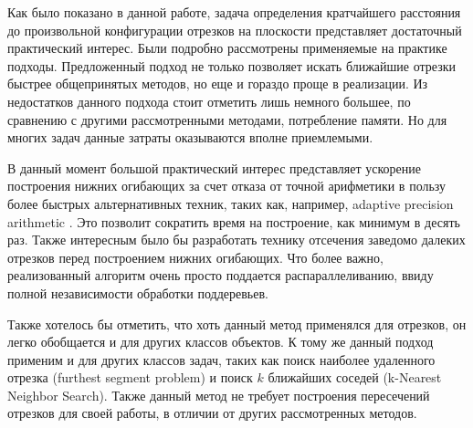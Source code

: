 \startconclusionpage

Как было показано в данной работе, задача определения кратчайшего
расстояния до произвольной конфигурации отрезков на плоскости представляет
достаточный практический интерес. Были подробно рассмотрены применяемые
на практике подходы. Предложенный подход не только позволяет искать
ближайшие отрезки быстрее общепринятых методов, но еще и гораздо проще в
реализации. Из недостатков данного подхода стоит отметить лишь немного большее, по
сравнению с другими рассмотренными методами, потребление памяти. Но для
многих задач данные затраты оказываются вполне приемлемыми.

В данный момент большой практический интерес представляет ускорение
построения нижних огибающих за счет отказа от точной арифметики в пользу более
быстрых альтернативных техник, таких как, например, adaptive precision
arithmetic \cite{APREC}. Это позволит сократить время на построение, как минимум в
десять раз. Также интересным было бы разработать технику отсечения
заведомо далеких отрезков перед построением нижних огибающих. Что более
важно, реализованный алгоритм очень просто поддается распараллеливанию,
ввиду полной независимости обработки поддеревьев.

Также хотелось бы отметить, что хоть данный метод применялся для
отрезков, он легко обобщается и для других классов объектов. К тому же
данный подход применим и для других классов задач, таких как поиск наиболее
удаленного отрезка (furthest segment problem) и поиск $k$ ближайших соседей
(k-Nearest Neighbor Search). Также данный метод не требует построения
пересечений отрезков для своей работы, в отличии от других рассмотренных
методов.

\FloatBarrier
